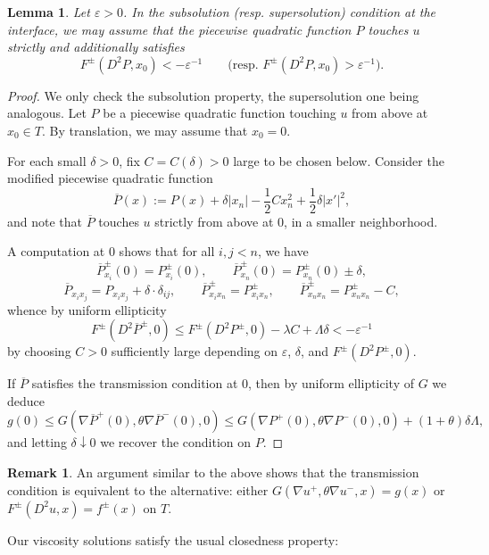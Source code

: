 \documentclass[letter,11pt]{amsart}
\newcommand{\vep}{\varepsilon}
\newtheorem{lem}[thm]{Lemma}
\theoremstyle{definition}
\newtheorem{rem}[thm]{Remark}
\numberwithin{equation}{section}
\begin{document}
\begin{lem}
\label{lem:trick}
Let $\vep > 0$.
In the subsolution (resp. supersolution) condition at the interface, we may assume that
the piecewise quadratic function $P$ touches $u$ strictly and additionally satisfies
\[
F^{\pm}(D^2 P, x_0) < - \vep^{-1} 
\qquad 
\text{(resp. } 
F^{\pm}(D^2 P, x_0) > \vep^{-1}
\text{)}.
\]
\end{lem}
\begin{proof}
We only check the subsolution property, the supersolution one being analogous.
Let $P$ be a piecewise quadratic function touching $u$ from above at $x_0 \in T$.
By translation, we may assume that $x_0 = 0$.

For each small $\delta > 0$, fix $C = C(\delta) > 0$ large to be chosen below.
Consider the modified piecewise quadratic function
\[
\overline{P}(x) 
:= P(x) + \delta |x_n| - \frac{1}{2} C x_n^2 + \frac{1}{2}\delta |x'|^2,
\]
and note that $\overline{P}$ touches $u$ strictly from above at $0$, in a smaller neighborhood.


A computation at $0$ shows that for all $i, j < n$, we have
\[
\overline{P}^{\pm}_{x_i}(0)= P^{\pm}_{x_i}(0), \qquad \overline{P}_{x_n}^{\pm}(0) = P^{\pm}_{x_n}(0) \pm \delta,
\]
\[
\overline{P}_{x_i x_j} = P_{x_i x_j} + \delta \cdot \delta_{ij}, \qquad \overline{P}^{\pm}_{x_i x_n} = P^{\pm}_{x_i x_n}, \qquad \overline{P}^{\pm}_{x_n x_n} = P^{\pm}_{x_n x_n} - C,
\]
whence by uniform ellipticity
\[
F^{\pm}(D^2 \overline{P}^{\pm}, 0) 
\leq F^{\pm}(D^2 P^{\pm}, 0) - \lambda C + \Lambda \delta 
< - \vep^{-1}
\]
by choosing $C > 0$ sufficiently large depending on $\vep$, $\delta$, and $F^{\pm}(D^2 P^{\pm}, 0)$.

If $\overline{P}$ satisfies the transmission condition at $0$, then by uniform ellipticity of $G$ we deduce
\[
g(0) \leq G(\nabla \overline{P}^{+}(0), \theta \nabla \overline{P}^{-}(0), 0) \leq G(\nabla P^{+}(0), \theta \nabla P^{-}(0), 0) + (1+\theta)\delta \Lambda,
\]
and letting $\delta \downarrow 0$ we recover the condition on $P$.
\end{proof}

\begin{rem}
An argument similar to the above shows that the transmission condition is equivalent to the alternative: 
either $G(\nabla u^{+}, \theta \nabla u^{-}, x) = g(x)$ or $F^{\pm}(D^2 u, x) = f^{\pm}(x)$ on $T$.
\end{rem}

\medskip

Our viscosity solutions satisfy the usual closedness property:
\end{document}
